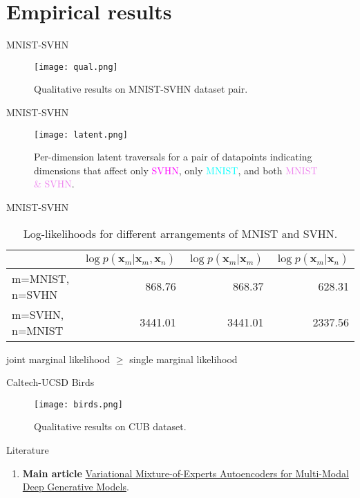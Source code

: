 \documentclass{beamer}
\begin{document}
\section{Empirical results}
\begin{frame}{MNIST-SVHN}
    \begin{figure}
        \centering
        \texttt{[image: qual.png]}
        \caption{Qualitative results on MNIST-SVHN dataset pair.}
        \label{fig:qual}
    \end{figure}
\end{frame}

\begin{frame}{MNIST-SVHN}
    \begin{figure}
        \centering
        \texttt{[image: latent.png]}
        \caption{Per-dimension latent traversals for a pair of datapoints indicating dimensions that affect only \textcolor{magenta}{SVHN}, only \textcolor{cyan}{MNIST}, and both \textcolor{violet}{MNIST \& SVHN}.}
        \label{fig:latent}
    \end{figure}
\end{frame}

\begin{frame}{MNIST-SVHN}
    \begin{table}[]
        \centering
        \begin{tabular}{l r r r}
         & $\log p(\textbf{x}_m | \textbf{x}_m, \textbf{x}_n )$ & $\log p(\textbf{x}_m | \textbf{x}_m)$ & $\log p(\textbf{x}_m | \textbf{x}_n)$ \\
         \hline
        m=MNIST, n=SVHN & 868.76 & 868.37 & 628.31 \\
        m=SVHN, n=MNIST & 3441.01 & 3441.01 & 2337.56 \\

        \end{tabular}
        \caption{Log-likelihoods for different arrangements of MNIST and SVHN.}
        \label{tab:my_label}
    \end{table}

    \begin{center}
        joint marginal likelihood $\ge$ single marginal likelihood
    \end{center}
\end{frame}

\begin{frame}{Caltech-UCSD Birds}
    \begin{figure}
        \centering
        \texttt{[image: birds.png]}
        \caption{Qualitative results on CUB dataset.}
        \label{fig:birds}
    \end{figure}
\end{frame}


\begin{frame}{Literature}
    \begin{enumerate}
        \item \textbf{Main article} \href{https://proceedings.neurips.cc/paper/2019/file/0ae775a8cb3b499ad1fca944e6f5c836-Paper.pdf}
        {Variational Mixture-of-Experts Autoencoders for Multi-Modal Deep Generative Models}.
    \end{enumerate}
\end{frame}
\end{document}

